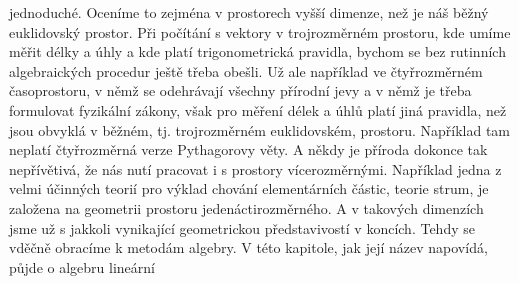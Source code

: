   jednoduché. Oceníme to zejména v prostorech vyšší dimenze, než je náš běžný euklidovský prostor. 
  Při počítání s vektory v trojrozměrném prostoru, kde umíme měřit délky a úhly a kde platí 
  trigonometrická pravidla, bychom se bez rutinních algebraických procedur ještě třeba obešli. Už 
  ale například ve čtyřrozměrném časoprostoru, v němž se odehrávají všechny přírodní jevy a v němž 
  je třeba formulovat fyzikální zákony, však pro měření délek a úhlů platí jiná pravidla, než jsou 
  obvyklá v běžném, tj. trojrozměrném euklidovském, prostoru. Například tam neplatí čtyřrozměrná 
  verze Pythagorovy věty. A někdy je příroda dokonce tak nepřívětivá, že nás nutí pracovat i s 
  prostory vícerozměrnými. Například jedna z velmi účinných teorií pro výklad chování elementárních 
  částic, teorie strum, je založena na geometrii prostoru jedenáctirozměrného. A v takových 
  dimenzích jsme už s jakkoli vynikající geometrickou představivostí v koncích. Tehdy se vděčně 
  obracíme k metodám algebry. V této kapitole, jak její název napovídá, půjde o algebru lineární
  
